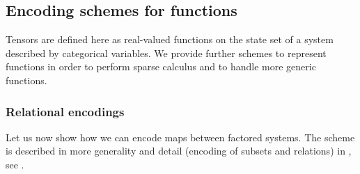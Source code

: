 \subsection{Encoding schemes for functions}

Tensors are defined here as real-valued functions on the state set of a system described by categorical variables.
We provide further schemes to represent functions in order to perform sparse calculus and to handle more generic functions.



%



\subsubsection{Relational encodings}

Let us now show how we can encode maps between factored systems.
The scheme is described in more generality and detail (encoding of subsets and relations) in , see .

